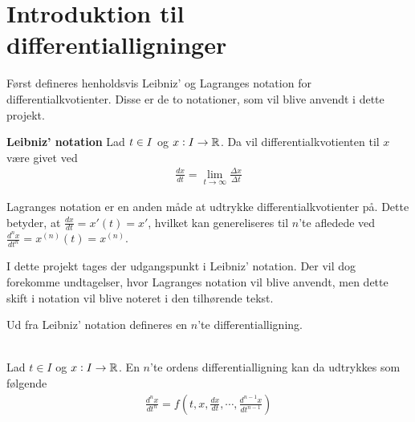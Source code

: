 \section{Introduktion til differentialligninger}
Først defineres henholdsvis Leibniz' og Lagranges notation for differentialkvotienter. Disse er de to notationer, som vil blive anvendt i dette projekt.

\begin{defn}\textbf{Leibniz' notation}
\newline
Lad $t \in I$ og $x:I \to \mathbb{R}$. Da vil differentialkvotienten til $x$ være givet ved
%
\begin{align*}
    \frac{dx}{dt}=\lim_{t \to \infty}\frac{\Delta x}{\Delta t}
\end{align*}

\end{defn}
Lagranges notation er en anden måde at udtrykke differentialkvotienter på. Dette betyder, at $\frac{dx}{dt}=x'(t)=x'$, hvilket kan genereliseres til $n$'te afledede ved $\frac{d^nx}{dt^n}=x^{(n)}(t)=x^{(n)}$.

I dette projekt tages der udgangspunkt i Leibniz' notation. Der vil dog forekomme undtagelser, hvor Lagranges notation vil blive anvendt, men dette skift i notation vil blive noteret i den tilhørende tekst.

Ud fra Leibniz' notation defineres en $n$'te differentialligning.

\begin{defn}\label{def:generel_differentialligning} \textbf{}\\
Lad $t \in I$ og $x:I \to \mathbb{R}$. En $n$'te ordens differentialligning kan da udtrykkes som følgende
%
\begin{align*}
    \frac{d^nx}{dt^n}=f\left(t, x, \frac{dx}{dt},\cdots, \frac{d^{n-1}x}{dt^{n-1}}\right )
\end{align*}
\end{defn}

